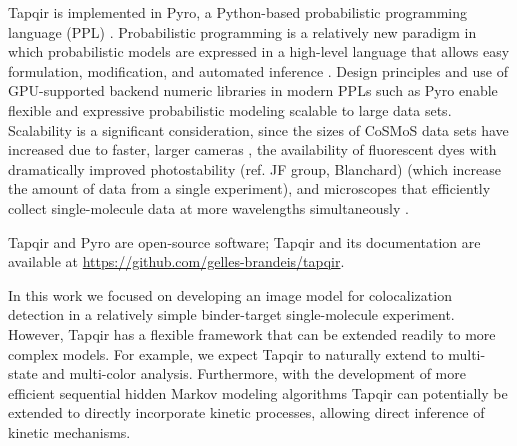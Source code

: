 Tapqir is implemented in Pyro, a Python-based probabilistic programming language (PPL) \cite{Bingham2019-qy}. Probabilistic programming is a relatively new paradigm in which probabilistic models are expressed in a high-level language that allows easy formulation, modification, and automated inference \cite{Van_de_Meent2018-mi}. Design principles and use of GPU-supported backend numeric libraries in modern PPLs such as Pyro enable flexible and expressive probabilistic modeling scalable to large data sets. Scalability is a significant consideration, since the sizes of CoSMoS data sets have increased due to faster, larger cameras \cite{Quan2011-cg}, the availability of fluorescent dyes with dramatically improved photostability \cite{Grimm2015-ea} (ref. JF group, Blanchard) (which increase the amount of data from a single experiment), and microscopes that efficiently collect single-molecule data at more wavelengths simultaneously \cite{Friedman2006-kb}. 

Tapqir and Pyro are open-source software; Tapqir and its documentation are available at \url{https://github.com/gelles-brandeis/tapqir}.


In this work we focused on developing an image model for colocalization detection in a relatively simple binder-target single-molecule experiment. However, Tapqir has a flexible framework that can be extended readily to more complex models. For example, we expect Tapqir to naturally extend to multi-state and multi-color analysis. Furthermore, with the development of more efficient sequential hidden Markov modeling algorithms \cite{Sarkka2019-jw,Obermeyer2019-pp} Tapqir can potentially be extended to directly incorporate kinetic processes, allowing direct inference of kinetic mechanisms.

